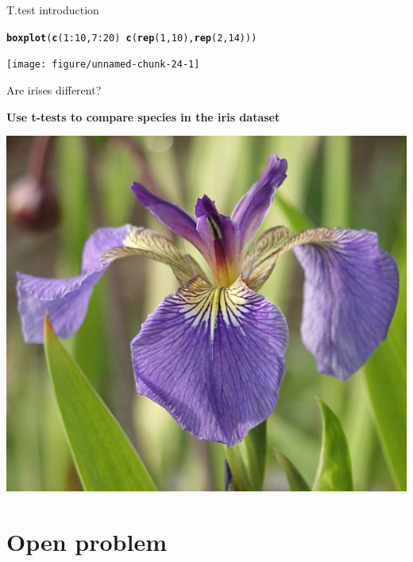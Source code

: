 \documentclass[10pt]{beamer}\usepackage[]{graphicx}\usepackage[]{color}
\makeatletter
\newcommand{\hlnum}[1]{\textcolor[rgb]{0.686,0.059,0.569}{#1}}%
\newcommand{\hlopt}[1]{\textcolor[rgb]{0,0,0}{#1}}%
\newcommand{\hlstd}[1]{\textcolor[rgb]{0.345,0.345,0.345}{#1}}%
\newcommand{\hlkwd}[1]{\textcolor[rgb]{0.737,0.353,0.396}{\textbf{#1}}}%
\newenvironment{kframe}{%
 \def\at@end@of@kframe{}%
 \ifinner\ifhmode%
  \def\at@end@of@kframe{\end{minipage}}%
  \begin{minipage}{\columnwidth}%
 \fi\fi%
 \def\FrameCommand##1{\hskip\@totalleftmargin \hskip-\fboxsep
 \colorbox{shadecolor}{##1}\hskip-\fboxsep
     \hskip-\linewidth \hskip-\@totalleftmargin \hskip\columnwidth}%
 \MakeFramed {\advance\hsize-\width
   \@totalleftmargin\z@ \linewidth\hsize
   \@setminipage}}%
 {\par\unskip\endMakeFramed%
 \at@end@of@kframe}
\newenvironment{knitrout}{}{} %
\makeatother
\begin{document}
\begin{frame}[fragile]{T.test introduction}%

\begin{knitrout}
\color{fgcolor}\begin{kframe}
\begin{alltt}
  \hlkwd{boxplot}\hlstd{(}\hlkwd{c}\hlstd{(}\hlnum{1}\hlopt{:}\hlnum{10}\hlstd{,} \hlnum{7}\hlopt{:}\hlnum{20}\hlstd{)} \hlopt{~} \hlkwd{c}\hlstd{(}\hlkwd{rep}\hlstd{(}\hlnum{1}\hlstd{,}\hlnum{10}\hlstd{),} \hlkwd{rep}\hlstd{(}\hlnum{2}\hlstd{,} \hlnum{14}\hlstd{)))}
\end{alltt}
\end{kframe}
\texttt{[image: figure/unnamed-chunk-24-1]} 

\end{knitrout}
\end{frame}

\begin{frame}[fragile]{Are irises different?}

  \textbf{Use t-tests to compare species in the iris dataset}
  
  \begin{center}
    \includegraphics[height=0.6\textwidth]{Figures/iris}
  \end{center}
\end{frame}

\section{Open problem}
\end{document}
